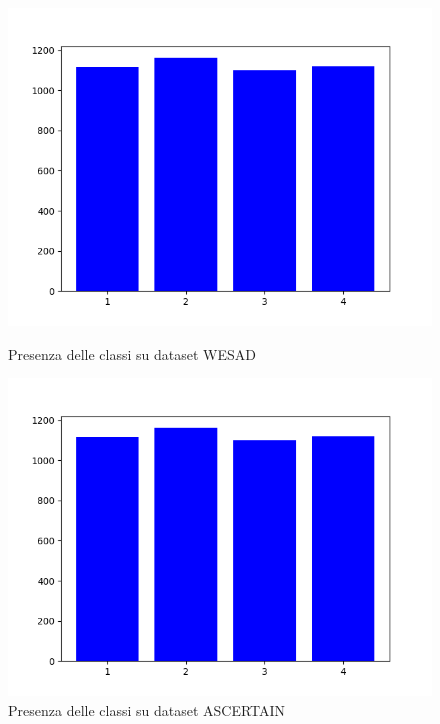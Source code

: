 \begin{figure}[h]
    \begin{minipage}[b]{0.5\textwidth}
		\includegraphics[width=\textwidth]{img/graphs/wesad_dataset.png}
		\caption{Presenza delle classi su dataset WESAD}
		\label{fig:wesadclasses}
	\end{minipage}
    \hfill
    \begin{minipage}[b]{0.5\textwidth}
		\includegraphics[width=\textwidth]{img/graphs/wesad_dataset.png}  %
		\caption{Presenza delle classi su dataset ASCERTAIN}
		\label{fig:ascertainclasses}
	\end{minipage}
\end{figure}